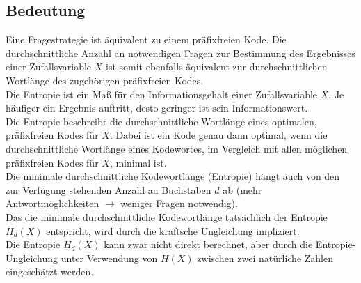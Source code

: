 \documentclass[a4paper]{article}
\begin{document}
\subsection{Bedeutung}
Eine Fragestrategie ist äquivalent zu einem präfixfreien Kode. Die durchschnittliche Anzahl an notwendigen Fragen zur Bestimmung des Ergebnisses einer Zufallsvariable $X$ ist somit ebenfalls äquivalent zur durchschnittlichen Wortlänge des zugehörigen präfixfreien Kodes.\\
Die Entropie ist ein Maß für den Informationsgehalt einer Zufallsvariable $X$. Je häufiger ein Ergebnis auftritt, desto geringer ist sein Informationswert.\\
Die Entropie beschreibt die durchschnittliche Wortlänge eines optimalen, präfixfreien Kodes für $X$. Dabei ist ein Kode genau dann optimal, wenn die durchschnittliche Wortlänge eines Kodewortes, im Vergleich mit allen möglichen präfixfreien Kodes für $X$, minimal ist.\\
Die minimale durchschnittliche Kodewortlänge (Entropie) hängt auch von den zur Verfügung stehenden Anzahl an Buchstaben $d$ ab (mehr Antwortmöglichkeiten $\rightarrow$ weniger Fragen notwendig).\\
Das die minimale durchschnittliche Kodewortlänge tatsächlich der Entropie $H_d(X)$ entspricht, wird durch die kraftsche Ungleichung impliziert.\\
Die Entropie $H_d(X)$ kann zwar nicht direkt berechnet, aber durch die Entropie-Ungleichung unter Verwendung von $H(X)$ zwischen zwei natürliche Zahlen eingeschätzt werden.
\end{document}
